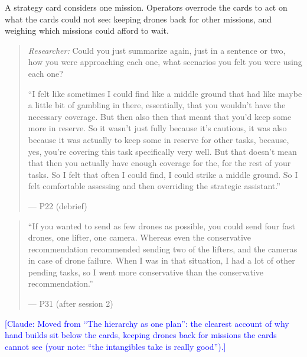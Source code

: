 \label{sec:qual:hierarchy:cross-mission}
A strategy card considers one mission. Operators overrode the cards to act on what the cards could not see: keeping drones back for other missions, and weighing which missions could afford to wait.

\begin{quote}\small
{\footnotesize\textit{Researcher:} Could you just summarize again, just in a sentence or two, how you were approaching each one, what scenarios you felt you were using each one?}\par\smallskip
``I felt like sometimes I could find like a middle ground that had like maybe a little bit of gambling in there, essentially, that you wouldn't have the necessary coverage. But then also then that meant that you'd keep some more in reserve. So it wasn't just fully because it's cautious, it was also because it was actually to keep some in reserve for other tasks, because, yes, you're covering this task specifically very well. But that doesn't mean that then you actually have enough coverage for the, for the rest of your tasks. So I felt that often I could find, I could strike a middle ground. So I felt comfortable assessing and then overriding the strategic assistant.''\par\hfill--- P22 (debrief)
\end{quote}

\begin{quote}\small
``If you wanted to send as few drones as possible, you could send four fast drones, one lifter, one camera. Whereas even the conservative recommendation recommended sending two of the lifters, and the cameras in case of drone failure. When I was in that situation, I had a lot of other pending tasks, so I went more conservative than the conservative recommendation.''\par\hfill--- P31 (after session 2)
\end{quote}
\textcolor{blue}{[Claude: Moved from ``The hierarchy as one plan'': the clearest account of why hand builds sit below the cards, keeping drones back for missions the cards cannot see (your note: ``the intangibles take is really good'').]}


\clearpage


